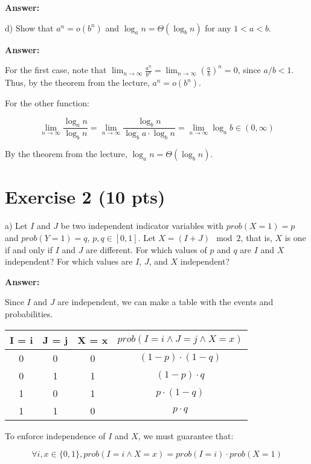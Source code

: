 \documentclass[a4paper]{article}
\begin{document}
\bigskip \noindent \textbf{Answer:}

\noindent d) Show that $a^n = o(b^n)$ and $\log_a n = \Theta (\log_b n)$ for any $1 < a < b$.

\bigskip \noindent \textbf{Answer:}

For the first case, note that $\lim_{n \rightarrow \infty}\frac{a^n}{b^n} = \lim_{n \rightarrow \infty}\left (\frac{a}{b} \right )^n = 0$, since $a/b < 1$. Thus, by the theorem from the lecture, $a^n = o(b^n)$.

For the other function:

$$\lim_{n \rightarrow \infty}\frac{\log_a n}{\log_b n} = \lim_{n \rightarrow \infty}\frac{\log_b n}{\log_b a \cdot \log_b n} = \lim_{n \rightarrow \infty} \log_a b \in (0,\infty)$$

By the theorem from the lecture, $\log_a n = \Theta(\log_b n)$.

\section{Exercise 2 (10 pts)}

\noindent a) Let $I$ and $J$ be two independent indicator variables with ${prob}(X = 1) = p$ and ${prob}(Y = 1) = q$, $p, q \in [0,1]$. Let $X = ( I + J) \mod 2$, that is, $X$ is one if and only if $I$ and $J$ are different. For which values of $p$ and $q$ are $I$ and $X$ independent? For which values are $I$, $J$, and $X$ independent?

\bigskip \noindent \textbf{Answer:}

Since $I$ and $J$ are independent, we can make a table with the events and probabilities.

\begin{center}
\begin{tabular}{ c | c | c | c }
  I = i & J = j & X = x & ${prob}(I = i \wedge J = j \wedge X = x)$\\
  \hline                       
  0 & 0 & 0 & $(1-p)\cdot (1-q)$\\
  0 & 1 & 1 & $(1-p)\cdot q$\\
  1 & 0 & 1 & $p\cdot (1-q)$\\
  1 & 1 & 0 & $p \cdot q$\\
  \hline  
\end{tabular}
\end{center}


To enforce independence of $I$ and $X$, we must guarantee that:

$$ \forall i, x \in \{0,1\}, {prob}(I = i \wedge X = x) = {prob}(I = i) \cdot {prob}(X = 1) $$
\end{document}
